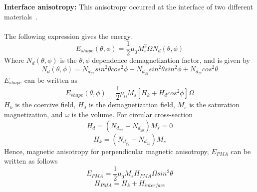 \documentclass[12pt,a4paper,bold]{thesis}
\theoremstyle{thm}
\theoremstyle{definition}
\begin{document}
\textbf{Interface anisotropy:} This anisotropy occurred at the interface of two different materials~\cite{ikeda2010perpendicular}.\\\\
The following expression gives the energy.
\[E_{shape}(\theta,\phi)=\frac{1}{2}\mu_0 M_s^2\Omega N_d(\theta,\phi)\]
Where $N_d(\theta,\phi)$ is the $\theta,\phi$ dependence demagnetization factor, and is given by
\[ N_d(\theta,\phi)=N_{d_{xx}} sin^2\theta cos^2 \phi + N_{d_{yy}} sin^2\theta sin^2\phi + N_{d_{zz}} cos^2 \theta \]
$E_{shape}$ can be written as
\[E_{shape}(\theta,\phi)=\frac{1}{2}\mu_0 M_s[H_k+H_d cos^2 \phi]\Omega\]
$H_k$ is the coercive field, $H_d$ is the demagnetization field, $M_s$ is the saturation magnetization, and $\omega$ is the volume.
For circular cross-section
\[H_d=(N_{d_{xx}} - N_{d_{yy}})M_s=0\]
\[H_k=(N_{d_{yy}} - N_{d_{zz}})M_s\]
Hence, magnetic anisotropy for perpendicular magnetic anisotropy, $E_{PMA}$ can be written as follows
\[E_{PMA}=\frac{1}{2}\mu_0 M_s H_{PMA}\Omega sin^2 \theta \]
\[H_{PMA}=H_k + H_{interface}\]
\pagebreak
\end{document}
